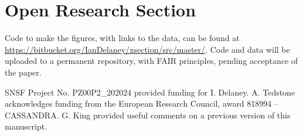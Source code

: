 \documentclass[draft]{agujournal2019}
\begin{document}
\section*{Open Research Section}

Code to make the figures, with links to the data, can be found at \url{https://bitbucket.org/IanDelaney/xsection/src/master/}.
Code and data will be uploaded to a permanent repository, with FAIR principles, pending acceptance of the paper.

\acknowledgments

SNSF Project No. PZ00P2\_202024 provided  funding for I. Delaney.
A. Tedstone acknowledges funding from the European Research Council, award 818994 -- CASSANDRA.
G. King provided useful comments on a previous version of this manuscript.




\newpage

\appendix
\end{document}
